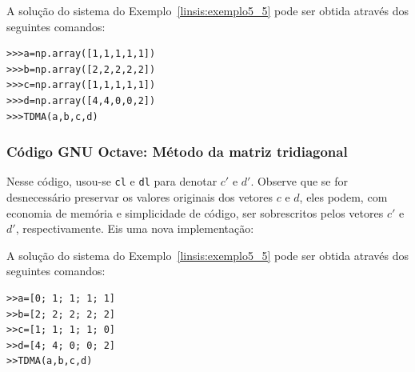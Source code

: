 

A solução do sistema do Exemplo~\ref{linsis:exemplo5_5} pode ser obtida através dos seguintes comandos:
\begin{verbatim}
>>>a=np.array([1,1,1,1,1])
>>>b=np.array([2,2,2,2,2])
>>>c=np.array([1,1,1,1,1])
>>>d=np.array([4,4,0,0,2])
>>>TDMA(a,b,c,d)
\end{verbatim}
\fi


\ifisoctave
\subsubsection{Código GNU Octave: Método da matriz tridiagonal}



Nesse código, usou-se \verb+cl+ e \verb+dl+ para denotar $c'$ e $d'$. Observe que se for desnecessário preservar os valores originais dos vetores $c$ e $d$, eles podem, com economia de memória e simplicidade de código, ser sobrescritos pelos vetores $c'$ e $d'$, respectivamente. Eis uma nova implementação:



A solução do sistema do Exemplo~\ref{linsis:exemplo5_5} pode ser obtida através dos seguintes comandos:
\begin{verbatim}
>>a=[0; 1; 1; 1; 1]
>>b=[2; 2; 2; 2; 2]
>>c=[1; 1; 1; 1; 0]
>>d=[4; 4; 0; 0; 2]
>>TDMA(a,b,c,d)
\end{verbatim}
\fi


